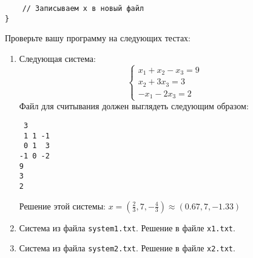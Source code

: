 \documentclass{article}
\begin{document}
\begin{itemize}
\begin{lstlisting}
    // Записываем x в новый файл
}
\end{lstlisting}
Проверьте вашу программу на следующих тестах: \\
\begin{enumerate}
\item Следующая система:
$$
\begin{cases} 
x_1 + x_2 - x_3 = 9 \\ 
x_2 + 3x_3 = 3 \\ 
-x_1 - 2x_3 = 2 
\end{cases}
$$
Файл для считывания должен выглядеть следующим образом:
\begin{lstlisting}
 3
 1 1 -1
 0 1  3
-1 0 -2
9
3
2
\end{lstlisting}
Решение этой системы: $x = (\frac{2}{3}, 7, -\frac{4}{3}) \approx (0.67, 7, -1.33)$
\item Система из файла \texttt{system1.txt}. Решение в файле \texttt{x1.txt}.
\item Система из файла \texttt{system2.txt}. Решение в файле \texttt{x2.txt}.
\end{enumerate}
\end{itemize}
\end{document}
